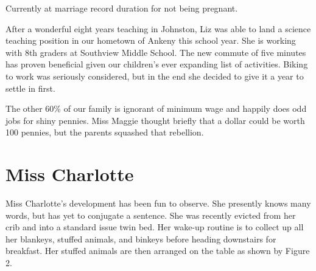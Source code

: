\documentclass[letterpaper,11pt]{article}
\makeatletter
\newenvironment{figurehere}
  {\def\@captype{figure}}
  {}
\makeatother
\begin{document}
\begin{multicols}{2}
\begin{figurehere}
 \centering   
 \caption{Currently at marriage record duration for not being pregnant.}
\end{figurehere}

After a wonderful eight years teaching in Johnston, Liz was able to land a
science teaching position in our hometown of Ankeny this school year. She is working
with 8th graders at Southview Middle School.  The new commute of five minutes
has proven beneficial given our children's ever expanding list of
activities.  Biking to work was seriously considered, but in the end she
decided to give it a year to settle in first.

The other 60\% of our family is ignorant of minimum wage and happily does odd
jobs for shiny pennies.  Miss Maggie thought briefly that a dollar could be
worth 100 pennies, but the parents squashed that rebellion.

\section{Miss Charlotte}

Miss Charlotte's development has been fun to observe.  She presently knows many
words, but has yet to conjugate a sentence.  She was recently evicted from her
crib and into a standard issue twin bed.  Her wake-up routine is
to collect up all her blankeys, stuffed animals, and binkeys before heading
downstairs for breakfast.  Her stuffed animals are then arranged on the table
as shown by Figure 2.


\end{multicols}
\end{document}
